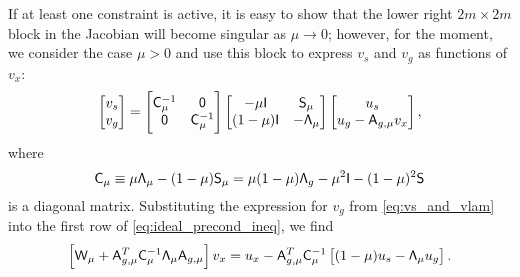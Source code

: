 If at least one constraint is active, it is easy to show that
the lower right $2m \times 2m$ block in the Jacobian will become singular as
$\mu \rightarrow 0$; however, for the moment, we consider the case $\mu > 0$ and
use this block to express $v_s$ and $v_g$ as functions of $v_x$:
\begin{equation}\label{eq:vs_and_vlam}
  \begin{bmatrix} v_s \\ v_g \end{bmatrix}
  =
  \begin{bmatrix}
    \mathsf{C}_\mu^{-1} & \mathsf{0} \\
    \mathsf{0} & \mathsf{C}_\mu^{-1}
  \end{bmatrix}
  \begin{bmatrix}
    -\mu \mathsf{I} & \mathsf{S}_\mu \\
    (1-\mu)\mathsf{I} & -\mathsf{\Lambda}_\mu 
  \end{bmatrix}
  \begin{bmatrix} u_s \\ u_g - \mathsf{A}_{g, \mu} v_x \end{bmatrix},
\end{equation}
where 
\begin{equation*}
  \mathsf{C}_{\mu} \equiv \mu \mathsf{\Lambda}_\mu - (1-\mu) \mathsf{S}_\mu
  = \mu (1-\mu) \mathsf{\Lambda}_g - \mu^2 \mathsf{I}- (1-\mu)^2 \mathsf{S}
\end{equation*}
is a diagonal matrix.  Substituting the expression for $v_g$ from
\eqref{eq:vs_and_vlam} into the first row of \eqref{eq:ideal_precond_ineq}, we find
\begin{equation}\label{eq:schur}
\left[\mathsf{W}_\mu + \mathsf{A}_{g, \mu}^T \mathsf{C}_\mu^{-1} \mathsf{\Lambda}_\mu \mathsf{A}_{g,\mu}
  \right] v_x = u_x - \mathsf{A}_{g,\mu}^T \mathsf{C}_{\mu}^{-1} \left[(1-\mu) u_s -
  \mathsf{\Lambda}_\mu u_g \right].
\end{equation}

